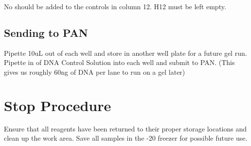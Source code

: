 \documentclass{ssiBio}
\begin{document}
No \tdt{} should be added to the controls in column 12. H12 must be left empty.

\subsection{Sending to PAN}

Pipette 10uL out of each well and store in another well plate for a future gel run. Pipette in  of DNA Control Solution into each well and submit to PAN. (This gives us roughly 60ng of DNA per lane to run on a gel later)

\section{Stop Procedure}
Ensure that all reagents have been returned to their proper storage locations and clean up the work area. Save all samples in the -20 freezer for possible future use.

\begin{comment}
\subsection{Analysis}

\begin{figure}[ht]
\centering
\texttt{[image: ./gels/Gel\_1.png]}
\label{}
\caption{Gel 1}
\end{figure}



\end{comment}
\end{document}
